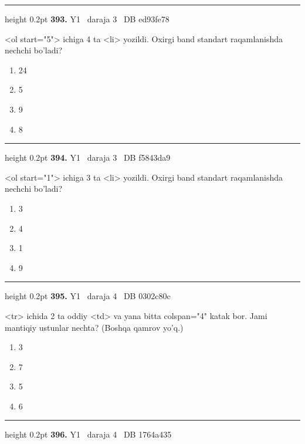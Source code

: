 \documentclass[10pt,a4paper,oneside]{article}
\begin{document}
\vspace{2mm}\hrule height 0.2pt \vspace{4mm}
\hypertarget{q393}{\textbf{\color{ink}393.}}  {\color{muted}\scriptsize Y1 \textbullet\ daraja 3 \textbullet\ DB ed93fe78}
\par
\textless{}ol start="5"\textgreater{} ichiga 4 ta \textless{}li\textgreater{} yozildi. Oxirgi band standart raqamlanishda nechchi bo'ladi?
\begin{enumerate}[label=\Alph*),leftmargin=9mm]
\item 24
\item 5
\item 9
\item 8
\end{enumerate}
\vspace{2mm}\hrule height 0.2pt \vspace{4mm}
\hypertarget{q394}{\textbf{\color{ink}394.}}  {\color{muted}\scriptsize Y1 \textbullet\ daraja 3 \textbullet\ DB f5843da9}
\par
\textless{}ol start="1"\textgreater{} ichiga 3 ta \textless{}li\textgreater{} yozildi. Oxirgi band standart raqamlanishda nechchi bo'ladi?
\begin{enumerate}[label=\Alph*),leftmargin=9mm]
\item 3
\item 4
\item 1
\item 9
\end{enumerate}
\vspace{2mm}\hrule height 0.2pt \vspace{4mm}
\hypertarget{q395}{\textbf{\color{ink}395.}}  {\color{muted}\scriptsize Y1 \textbullet\ daraja 4 \textbullet\ DB 0302c80c}
\par
\textless{}tr\textgreater{} ichida 2 ta oddiy \textless{}td\textgreater{} va yana bitta colspan="4" katak bor. Jami mantiqiy ustunlar nechta? (Boshqa qamrov yo'q.)
\begin{enumerate}[label=\Alph*),leftmargin=9mm]
\item 3
\item 7
\item 5
\item 6
\end{enumerate}
\vspace{2mm}\hrule height 0.2pt \vspace{4mm}
\hypertarget{q396}{\textbf{\color{ink}396.}}  {\color{muted}\scriptsize Y1 \textbullet\ daraja 4 \textbullet\ DB 1764a435}
\end{document}
